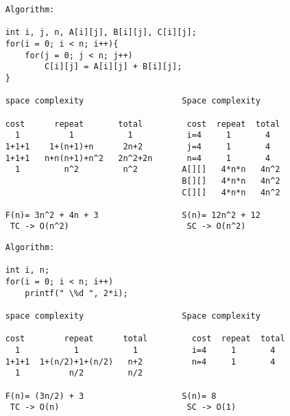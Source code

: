 \documentclass{article}
\begin{document}
\newpage
\hrulefill
    \begin{verbatim}
    Algorithm:

    int i, j, n, A[i][j], B[i][j], C[i][j];
    for(i = 0; i < n; i++){
        for(j = 0; j < n; j++)
            C[i][j] = A[i][j] + B[i][j];
    }
    
    space complexity                    Space complexity

    cost      repeat       total         cost  repeat  total
      1          1           1           i=4     1       4
    1+1+1    1+(n+1)+n      2n+2         j=4     1       4
    1+1+1   n+n(n+1)+n^2   2n^2+2n       n=4     1       4
      1         n^2         n^2         A[][]   4*n*n   4n^2
                                        B[][]   4*n*n   4n^2
                                        C[][]   4*n*n   4n^2

    F(n)= 3n^2 + 4n + 3                 S(n)= 12n^2 + 12
     TC -> O(n^2)                        SC -> O(n^2)
\end{verbatim}

\hrulefill
\begin{verbatim}
    Algorithm:

    int i, n;
    for(i = 0; i < n; i++)
        printf(" \%d ", 2*i);
    
    space complexity                    Space complexity

    cost        repeat      total         cost  repeat  total
      1           1           1           i=4     1       4
    1+1+1  1+(n/2)+1+(n/2)   n+2          n=4     1       4
      1          n/2         n/2         

    F(n)= (3n/2) + 3                    S(n)= 8
     TC -> O(n)                          SC -> O(1)
\end{verbatim}

\hrulefill
\end{document}
